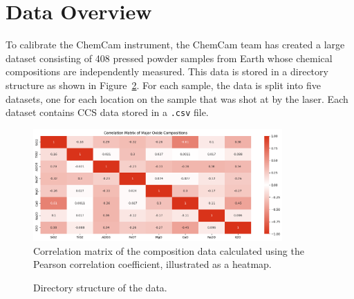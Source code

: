 \section{Data Overview}\label{sec:data_overview}
To calibrate the ChemCam instrument, the ChemCam team has created a large dataset consisting of 408 pressed powder samples from Earth whose chemical compositions are independently measured\cite{cleggRecalibrationMarsScience2017}.
This data is stored in a directory structure as shown in Figure~\ref{fig:directory_structure}.
For each sample, the data is split into five datasets, one for each location on the sample that was shot at by the laser.
Each dataset contains CCS data stored in a \texttt{.csv} file.

\begin{figure}[b]
	\centering
	\includegraphics[width=0.85\textwidth]{images/oxide_corr.png}
	\caption{Correlation matrix of the composition data calculated using the Pearson correlation coefficient, illustrated as a heatmap.}
	\label{fig:oxide_corr}
\end{figure}

\begin{figure}[ht]
\caption{Directory structure of the data.}
\label{fig:directory_structure}
\end{figure}

